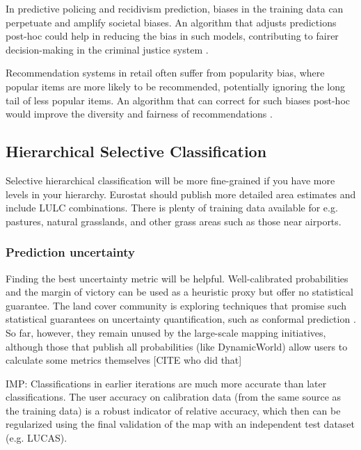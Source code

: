             In predictive policing and recidivism prediction, biases in the training data can perpetuate and amplify societal biases. An algorithm that adjusts predictions post-hoc could help in reducing the bias in such models, contributing to fairer decision-making in the criminal justice system \citep{berk2021fairness, dressel2018accuracy}.

            Recommendation systems in retail often suffer from popularity bias, where popular items are more likely to be recommended, potentially ignoring the long tail of less popular items. An algorithm that can correct for such biases post-hoc would improve the diversity and fairness of recommendations \citep{abdollahpouri2019managing}.
    
    
    \subsection{Hierarchical Selective Classification}
    
        Selective hierarchical classification will be more fine-grained if you have more levels in your hierarchy.
        Eurostat should publish more detailed area estimates and include LULC combinations. There is plenty of training data available for e.g. pastures, natural grasslands, and other grass areas such as those near airports.

        \subsubsection{Prediction uncertainty}
        
            Finding the best uncertainty metric will be helpful. Well-calibrated probabilities and the margin of victory \citep{calderon-loor2021high} can be used as a heuristic proxy but offer no statistical guarantee. The land cover community is exploring techniques that promise such statistical guarantees on uncertainty quantification, such as conformal prediction \citep{angelopoulos2023predictionpowered,valle2023quantifying,singh2024uncertainty}. So far, however, they remain unused by the large-scale mapping initiatives, although those that publish all probabilities (like DynamicWorld) allow users to calculate some metrics themselves [CITE who did that]
        
            IMP: Classifications in earlier iterations are much more accurate than later classifications. The user accuracy on calibration data (from the same source as the training data) is a robust indicator of relative accuracy, which then can be regularized using the final validation of the map with an independent test dataset (e.g. LUCAS).
    
